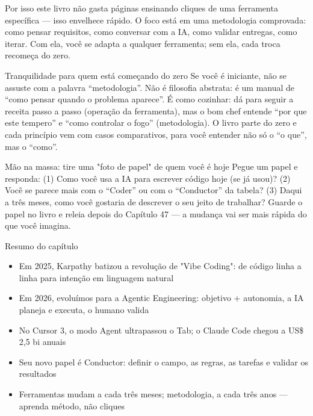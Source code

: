Por isso este livro não gasta páginas ensinando cliques de uma ferramenta específica — isso envelhece rápido. O foco está em uma metodologia comprovada: como pensar requisitos, como conversar com a IA, como validar entregas, como iterar. Com ela, você se adapta a qualquer ferramenta; sem ela, cada troca recomeça do zero.

\begin{tcbinfo}{Tranquilidade para quem está começando do zero}
Se você é iniciante, não se assuste com a palavra “metodologia”. Não é filosofia abstrata: é um manual de “como pensar quando o problema aparece”. É como cozinhar: dá para seguir a receita passo a passo (operação da ferramenta), mas o bom chef entende “por que este tempero” e “como controlar o fogo” (metodologia). O livro parte do zero e cada princípio vem com casos comparativos, para você entender não só o “o que”, mas o “como”.

\end{tcbinfo}

\begin{tcbpractice}{Mão na massa: tire uma "foto de papel" de quem você é hoje}
Pegue um papel e responda: (1) Como você usa a IA para escrever código hoje (se já usou)? (2) Você se parece mais com o “Coder” ou com o “Conductor” da tabela? (3) Daqui a três meses, como você gostaria de descrever o seu jeito de trabalhar? Guarde o papel no livro e releia depois do Capítulo 47 — a mudança vai ser mais rápida do que você imagina.

\end{tcbpractice}

\begin{tcbsummary}{Resumo do capítulo}
\begin{itemize}
  \item Em 2025, Karpathy batizou a revolução de "Vibe Coding": de código linha a linha para intenção em linguagem natural
  \item Em 2026, evoluímos para a Agentic Engineering: objetivo + autonomia, a IA planeja e executa, o humano valida
  \item No Cursor 3, o modo Agent ultrapassou o Tab; o Claude Code chegou a US\$ 2,5 bi anuais
  \item Seu novo papel é Conductor: definir o campo, as regras, as tarefas e validar os resultados
  \item Ferramentas mudam a cada três meses; metodologia, a cada três anos — aprenda método, não cliques
\end{itemize}

\end{tcbsummary}
